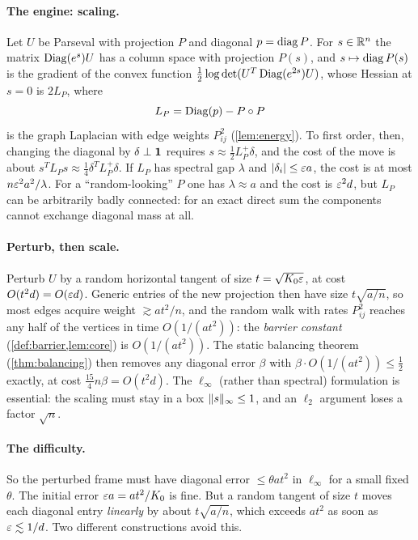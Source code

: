 \paragraph{The engine: scaling.}
Let $U$ be Parseval with projection $P$ and diagonal $p=\operatorname{diag} P$. For
$s\in\mathbb R^n$ the matrix $\operatorname{Diag}(e^s)U$ has a column space with projection $P(s)$,
and $s\mapsto\operatorname{diag} P(s)$ is the gradient of the convex function
$\frac12\log\det(U^T\operatorname{Diag}(e^{2s})U)$, whose Hessian at $s=0$ is $2L_P$, where
\[
 L_P=\operatorname{Diag}(p)-P\circ P
\]
is the graph Laplacian with edge weights $P_{ij}^2$ (\cref{lem:energy}). To
first order, then, changing the diagonal by $\delta\perp\mathbf 1$ requires
$s\approx\frac12L_P^{+}\delta$, and the cost of the move is about
$s^TL_Ps\approx\frac14\delta^TL_P^{+}\delta$. If $L_P$ has spectral gap
$\lambda$ and $|\delta_i|\le\varepsilon a$, the cost is at most $n\varepsilon^2a^2/\lambda$.
For a ``random-looking'' $P$ one has $\lambda\approx a$ and the cost is
$\varepsilon^2 d$, but $L_P$ can be arbitrarily badly connected: for an exact direct
sum the components cannot exchange diagonal mass at all.

\paragraph{Perturb, then scale.}
Perturb $U$ by a random horizontal tangent of size $t=\sqrt{K_0\varepsilon}$, at cost
$O(t^2d)=O(\varepsilon d)$. Generic entries of the new projection then have size
$t\sqrt{a/n}$, so most edges acquire weight $\gtrsim at^2/n$, and the random
walk with rates $P_{ij}^2$ reaches any half of the vertices in time $O(1/(at^2))$:
the \emph{barrier constant} (\cref{def:barrier,lem:core}) is $O(1/(at^2))$. The
static balancing theorem (\cref{thm:balancing}) then removes any diagonal error
$\beta$ with $\beta\cdot O(1/(at^2))\le\frac12$ exactly, at cost
$\frac{15}4n\beta=O(t^2d)$. The $\ell_\infty$ (rather than spectral) formulation is
essential: the scaling must stay in a box $\lVert s\rVert_\infty\le1$, and an $\ell_2$
argument loses a factor $\sqrt n$.

\paragraph{The difficulty.}
So the perturbed frame must have diagonal error $\le\theta at^2$ in
$\ell_\infty$ for a small fixed $\theta$. The initial error $\varepsilon a=at^2/K_0$ is
fine. But a random tangent of size $t$ moves each diagonal entry
\emph{linearly} by about $t\sqrt{a/n}$, which exceeds $at^2$ as soon as
$\varepsilon\lesssim1/d$. Two different constructions avoid this.

